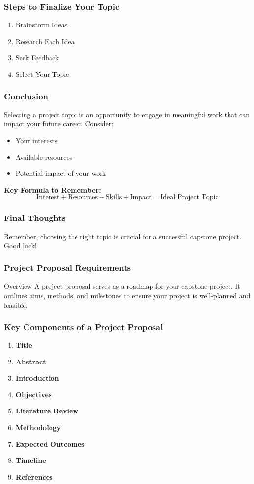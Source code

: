 \documentclass[aspectratio=169]{beamer}
\begin{document}
\begin{frame}[fragile]
    \frametitle{Steps to Finalize Your Topic}
    \begin{enumerate}
        \item Brainstorm Ideas
        \item Research Each Idea
        \item Seek Feedback
        \item Select Your Topic
    \end{enumerate}
\end{frame}

\begin{frame}[fragile]
    \frametitle{Conclusion}
    Selecting a project topic is an opportunity to engage in meaningful work that can impact your future career. Consider:
    \begin{itemize}
        \item Your interests
        \item Available resources
        \item Potential impact of your work
    \end{itemize}
    \textbf{Key Formula to Remember:}
    \begin{equation}
        \text{Interest} + \text{Resources} + \text{Skills} + \text{Impact} = \text{Ideal Project Topic}
    \end{equation}
\end{frame}

\begin{frame}[fragile]
    \frametitle{Final Thoughts}
    Remember, choosing the right topic is crucial for a successful capstone project. Good luck!
\end{frame}

\begin{frame}[fragile]
    \frametitle{Project Proposal Requirements}
    \begin{block}{Overview}
        A project proposal serves as a roadmap for your capstone project. 
        It outlines aims, methods, and milestones to ensure your project is well-planned and feasible.
    \end{block}
\end{frame}

\begin{frame}[fragile]
    \frametitle{Key Components of a Project Proposal}
    \begin{enumerate}
        \item \textbf{Title}
        \item \textbf{Abstract}
        \item \textbf{Introduction}
        \item \textbf{Objectives}
        \item \textbf{Literature Review}
        \item \textbf{Methodology}
        \item \textbf{Expected Outcomes}
        \item \textbf{Timeline}
        \item \textbf{References}
    \end{enumerate}
\end{frame}
\end{document}
